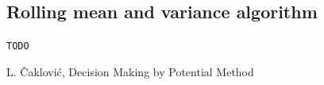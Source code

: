 \documentclass[letterpaper, 10 pt, conference]{ieeeconf}
\begin{document}
  \subsection{Rolling mean and variance algorithm}
  \label{sub:rolling}
  
  \verb|TODO|

  \begin{thebibliography}{9} %
    
   L. \v{C}aklovi\'{c}, Decision Making by Potential Method

\end{thebibliography}
\end{document}
